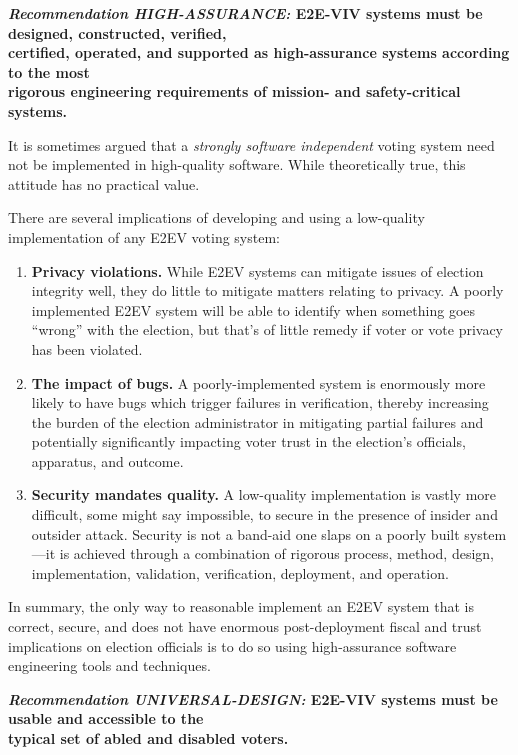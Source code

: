 \begin{center}
  \textbf{\emph{Recommendation HIGH-ASSURANCE:} E2E-VIV systems must
    be designed,
    constructed, verified,\\
    certified, operated, and supported as high-assurance systems
    according to the most\\
    rigorous engineering requirements of mission- and safety-critical
    systems.}
\end{center}

It is sometimes argued that a \emph{strongly software independent}
voting system need not be implemented in high-quality software. While
theoretically true, this attitude has no practical value.

There are several implications of developing and using a low-quality
implementation of any E2EV voting system:
\begin{enumerate}
\item \textbf{Privacy violations. }While E2EV systems can mitigate
  issues of election integrity well, they do little to mitigate
  matters relating to privacy.  A poorly implemented E2EV system will
  be able to identify when something goes ``wrong'' with the election,
  but that's of little remedy if voter or vote privacy has been
  violated.
\item \textbf{The impact of bugs.} A poorly-implemented system is
  enormously more likely to have bugs which trigger failures in
  verification, thereby increasing the burden of the election
  administrator in mitigating partial failures and potentially
  significantly impacting voter trust in the election's officials,
  apparatus, and outcome.
\item \textbf{Security mandates quality.} A low-quality implementation
  is vastly more difficult, some might say impossible, to secure in
  the presence of insider and outsider attack. Security is not a
  band-aid one slaps on a poorly built system---it is achieved through
  a combination of rigorous process, method, design, implementation,
  validation, verification, deployment, and operation.
\end{enumerate}

In summary, the only way to reasonable implement an E2EV system that
is correct, secure, and does not have enormous post-deployment fiscal
and trust implications on election officials is to do so using
high-assurance software engineering tools and techniques.

\begin{center}
  \textbf{\emph{Recommendation UNIVERSAL-DESIGN:} E2E-VIV systems must
    be usable and accessible to the\\
    typical set of abled and disabled voters.}
\end{center}

